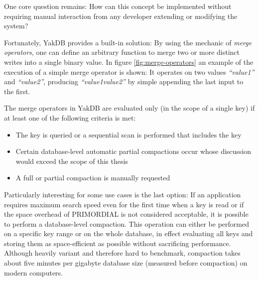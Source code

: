 \documentclass[a4paper, 12pt, twoside, reqn]{report}
\numberwithin{figure}{chapter}
\newtheorem[L]{boxedDefinition}{Definition}
\newtheorem[L]{boxedExample}{Example}
\newcommand{\itquote}[1]{\textit{{``}#1{''}}}
\begin{document}
One core question remains: How can this concept be implemented without requiring manual interaction from any developer extending or modifying the system?

Fortunately, YakDB provides a built-in solution: By using the mechanic of \textit{merge operators}, one can define an arbitrary function to merge two or more distinct writes into a single binary value. In figure \ref{fig:merge-operators} an example of the execution of a simple merge operator is shown: It operates on two values \itquote{value1} and \itquote{value2}, producing \itquote{value1value2} by simple appending the last input to the first.

The merge operators in YakDB are evaluated only (in the scope of a single key) if at least one of the following criteria is met:
\begin{itemize}
 \item The key is queried or a sequential scan is performed that includes the key
 \item Certain database-level automatic partial compactions occur whose discussion would exceed the scope of this thesis
 \item A full or partial compaction is manually requested
\end{itemize}

Particularly interesting for some use cases is the last option: If an application requires maximum search speed even for the first time when a key is read or if the space overhead of PRIMORDIAL is not considered acceptable, it is possible to perform a database-level compaction. This operation can either be performed on a specific key range or on the whole database, in effect evaluating all keys and storing them as space-efficient as possible without sacrificing performance. Although heavily variant and therefore hard to benchmark, compaction takes about five minutes per gigabyte database size (measured before compaction) on modern computers.

\end{document}
